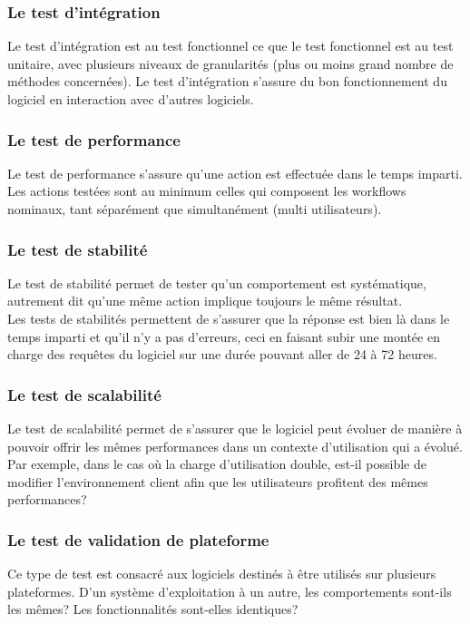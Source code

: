 \subsubsection{Le test d'int\'{e}gration}
Le test d'int\'{e}gration est au test fonctionnel ce que le test fonctionnel est au test unitaire, avec plusieurs niveaux de granularit\'{e}s (plus ou moins grand nombre de m\'{e}thodes concern\'{e}es). Le test d'int\'{e}gration s'assure du bon fonctionnement du logiciel en interaction avec d'autres logiciels.

\subsubsection{Le test de performance}
Le test de performance s'assure qu'une action est effectu\'{e}e dans le temps imparti. Les actions test\'{e}es sont au minimum celles qui composent les workflows nominaux, tant s\'{e}par\'{e}ment que simultan\'{e}ment (multi utilisateurs).

\subsubsection{Le test de stabilit\'{e}}
Le test de stabilit\'{e} permet de tester qu'un comportement est syst\'{e}matique, autrement dit qu'une m\^{e}me action implique toujours le m\^{e}me r\'{e}sultat.\\
Les tests de stabilit\'{e}s permettent de s'assurer que la r\'{e}ponse est bien l\`{a} dans le temps imparti et qu'il n'y a pas d'erreurs, ceci en faisant subir une mont\'{e}e en charge des requ\^{e}tes du logiciel sur une dur\'{e}e pouvant aller de 24 \`{a} 72 heures.

\subsubsection{Le test de scalabilit\'{e}}
Le test de scalabilit\'{e} permet de s'assurer que le logiciel peut \'{e}voluer de mani\`{e}re \`{a} pouvoir offrir les m\^{e}mes performances dans un contexte d'utilisation qui a \'{e}volu\'{e}. Par exemple, dans le cas o\`{u} la charge d'utilisation double, est-il possible de modifier l'environnement client afin que les utilisateurs profitent des m\^{e}mes performances?


\subsubsection{Le test de validation de plateforme}
Ce type de test est consacr\'{e} aux logiciels destin\'{e}s \`{a} \^{e}tre utilis\'{e}s sur plusieurs plateformes. D'un syst\`{e}me d'exploitation \`{a} un autre, les comportements sont-ils les m\^{e}mes? Les fonctionnalit\'{e}s sont-elles identiques?




